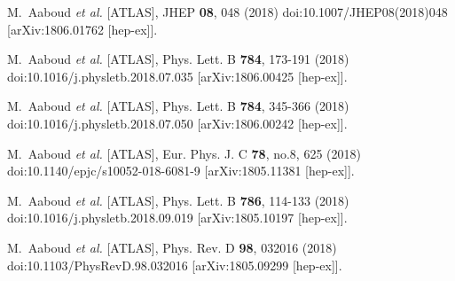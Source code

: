 \begin{thebibliography}{9}
M.~Aaboud \textit{et al.} [ATLAS],
JHEP \textbf{08}, 048 (2018)
doi:10.1007/JHEP08(2018)048
[arXiv:1806.01762 [hep-ex]].

M.~Aaboud \textit{et al.} [ATLAS],
Phys. Lett. B \textbf{784}, 173-191 (2018)
doi:10.1016/j.physletb.2018.07.035
[arXiv:1806.00425 [hep-ex]].

M.~Aaboud \textit{et al.} [ATLAS],
Phys. Lett. B \textbf{784}, 345-366 (2018)
doi:10.1016/j.physletb.2018.07.050
[arXiv:1806.00242 [hep-ex]].

M.~Aaboud \textit{et al.} [ATLAS],
Eur. Phys. J. C \textbf{78}, no.8, 625 (2018)
doi:10.1140/epjc/s10052-018-6081-9
[arXiv:1805.11381 [hep-ex]].

M.~Aaboud \textit{et al.} [ATLAS],
Phys. Lett. B \textbf{786}, 114-133 (2018)
doi:10.1016/j.physletb.2018.09.019
[arXiv:1805.10197 [hep-ex]].

M.~Aaboud \textit{et al.} [ATLAS],
Phys. Rev. D \textbf{98}, 032016 (2018)
doi:10.1103/PhysRevD.98.032016
[arXiv:1805.09299 [hep-ex]].


\end{thebibliography}

